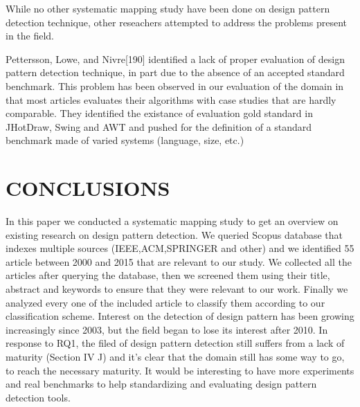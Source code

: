 \documentclass[letterpaper, 10 pt, conference]{ieeeconf}  %
\begin{document}
While no other systematic mapping study have been done on design pattern
detection technique, other reseachers attempted to address the problems
present in the field.

Pettersson, Lowe, and Nivre[190] identified a lack of proper evaluation of 
design pattern detection technique, in part due to the absence of an accepted
standard benchmark.
This problem has been observed in our evaluation of the domain in that most
articles evaluates their algorithms with case studies that are hardly
comparable.
They identified the existance of evaluation gold standard in JHotDraw, Swing
and AWT  and pushed for the definition of a standard benchmark made of varied
systems (language, size, etc.)



\section{CONCLUSIONS}

In this paper we conducted a systematic mapping study to get an overview on existing research on design pattern detection. We queried Scopus database that indexes multiple sources (IEEE,ACM,SPRINGER and other) and we identified 55 article between 2000 and 2015 that are relevant to our study. We collected all the articles after querying the database, then we screened them using their title, abstract and keywords to ensure that they were relevant to our work. Finally we analyzed every one of the included article to classify them according to our classification scheme.
Interest on the detection of design pattern has been growing increasingly since 2003, but the field began to lose its interest after 2010.
In response to RQ1, the filed of design pattern detection still suffers from a lack of maturity 
(Section IV J) and it's clear that the domain  still has some way to go, to reach the necessary maturity. It would be interesting to have more experiments and real benchmarks to help  standardizing and evaluating design pattern detection tools. 



\addtolength{\textheight}{-12cm}   

\end{document}
